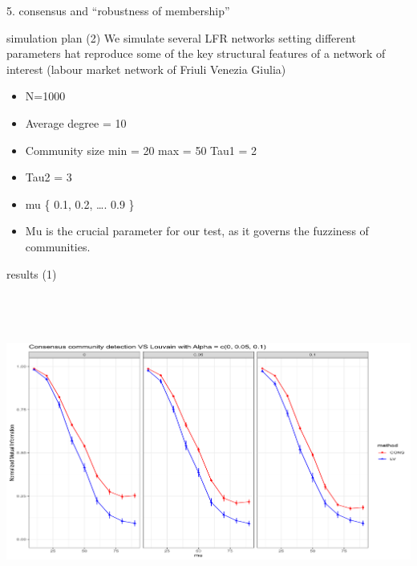 \documentclass[
  ignorenonframetext,
]{beamer}
\begin{document}
\begin{frame}[fragile]{5. consensus and ``robustness of membership''}
\begin{block}{simulation plan (2)}
\protect\hypertarget{simulation-plan-2}{}
We simulate several LFR networks setting different parameters hat
reproduce some of the key structural features of a network of interest
(labour market network of Friuli Venezia Giulia)

\begin{itemize}
\item
  N=1000
\item
  Average degree = 10
\item
  Community size min = 20 max = 50 Tau1 = 2
\item
  Tau2 = 3
\item
  mu \{ 0.1, 0.2, \ldots. 0.9 \}
\item
  Mu is the crucial parameter for our test, as it governs the fuzziness
  of communities.
\end{itemize}
\end{block}

\begin{block}{results (1)}
\protect\hypertarget{results-1-1}{}
\includegraphics[width=7.91667in,height=4.39583in]{images/paste-89AB04A9.png}
\end{block}


\end{frame}
\end{document}
